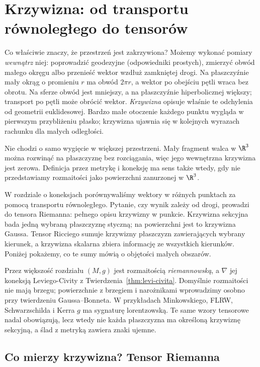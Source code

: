 \chapter{Krzywizna: od transportu równoległego do tensorów}
\label{ch:krzywizna}

Co właściwie znaczy, że przestrzeń jest zakrzywiona?
Możemy wykonać pomiary \emph{wewnątrz} niej: poprowadzić
geodezyjne (odpowiedniki prostych), zmierzyć obwód małego
okręgu albo przenieść wektor wzdłuż zamkniętej drogi.
Na płaszczyźnie mały okrąg o promieniu $r$ ma obwód
$2\pi r$, a wektor po obejściu pętli wraca bez obrotu.
Na sferze obwód jest mniejszy, a na płaszczyźnie
hiperbolicznej większy; transport po pętli może obrócić
wektor. \emph{Krzywizna} opisuje właśnie te odchylenia
od geometrii euklidesowej. Bardzo małe otoczenie
każdego punktu wygląda w pierwszym przybliżeniu
płasko; krzywizna ujawnia się w kolejnych wyrazach
rachunku dla małych odległości.

Nie chodzi o samo wygięcie w większej przestrzeni.
Mały fragment walca w $\R^3$ można rozwinąć na płaszczyznę
bez rozciągania, więc jego wewnętrzna krzywizna jest
zerowa. Definicja przez metrykę i koneksję ma sens
także wtedy, gdy nie przedstawiamy rozmaitości jako
powierzchni zanurzonej w $\R^3$.

W rozdziale o koneksjach porównywaliśmy wektory w różnych
punktach za pomocą transportu równoległego. Pytanie,
czy wynik zależy od drogi, prowadzi do tensora Riemanna:
pełnego opisu krzywizny w punkcie. Krzywizna sekcyjna
bada jedną wybraną płaszczyznę styczną; na powierzchni
jest to krzywizna Gaussa. Tensor Ricciego sumuje
krzywizny płaszczyzn zawierających wybrany kierunek,
a krzywizna skalarna zbiera informację ze wszystkich
kierunków. Poniżej pokażemy, co te sumy mówią o
objętości małych obszarów.

Przez większość rozdziału $(M,g)$ jest rozmaitością
\emph{riemannowską}, a $\nabla$ jej koneksją Leviego-Civity
z Twierdzenia~\ref{thm:levi-civita}. Domyślnie rozmaitości
nie mają brzegu; powierzchnie z brzegiem i narożnikami
wprowadzimy osobno przy twierdzeniu Gaussa--Bonneta. W przykładach
Minkowskiego, FLRW, Schwarzschilda i Kerra
$g$ ma sygnaturę lorentzowską.
Te same wzory tensorowe nadal obowiązują, lecz wtedy
nie każda płaszczyzna ma określoną krzywiznę sekcyjną,
a ślad z metryką zawiera znaki ujemne.

\section{Co mierzy krzywizna? Tensor Riemanna}

